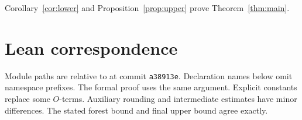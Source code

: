 \documentclass[11pt,a4paper]{article}
\numberwithin{equation}{section}
\theoremstyle{definition}
\theoremstyle{remark}
\begin{document}
Corollary~\ref{cor:lower} and Proposition~\ref{prop:upper} prove Theorem~\ref{thm:main}.

\appendix
\section{Lean correspondence}\label{app:lean}
Module paths are relative to  at commit \texttt{a38913e}. Declaration names below omit namespace prefixes. The formal proof uses the same argument. Explicit constants replace some $O$-terms. Auxiliary rounding and intermediate estimates have minor differences. The stated forest bound and final upper bound agree exactly.
\end{document}
